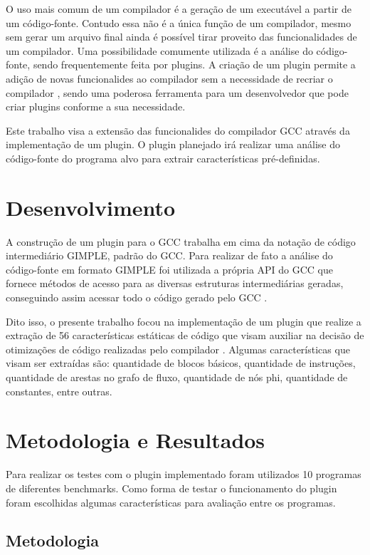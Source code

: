 \documentclass[journal]{IEEEtran}
\begin{document}
O uso mais comum de um compilador é a geração de um executável a partir de um código-fonte. Contudo essa não é a única função de um compilador, mesmo sem gerar um arquivo final ainda é possível tirar proveito das funcionalidades de um compilador. Uma possibilidade comumente utilizada é a análise do código-fonte, sendo frequentemente feita por plugins. A criação de um plugin permite a adição de novas funcionalides ao compilador sem a necessidade de recriar o compilador \cite{GCC-DOCS}, sendo uma poderosa ferramenta para um desenvolvedor que pode criar plugins conforme a sua necessidade.

Este trabalho visa a extensão das funcionalides do compilador GCC \cite{GCC} através da implementação de um plugin. O plugin planejado irá realizar uma análise do código-fonte do programa alvo para extrair características pré-definidas.

\section{Desenvolvimento}

A construção de um plugin para o GCC trabalha em cima da notação de código intermediário GIMPLE, padrão do GCC. Para realizar de fato a análise do código-fonte em formato GIMPLE foi utilizada a própria API do GCC que fornece métodos de acesso para as diversas estruturas intermediárias geradas, conseguindo assim acessar todo o código gerado pelo GCC \cite{gcc2}.

Dito isso, o presente trabalho focou na implementação de um plugin que realize a extração de 56 características estáticas de código que visam auxiliar na decisão de otimizações de código realizadas pelo compilador \cite{features}. Algumas características que visam ser extraídas são: quantidade de blocos básicos, quantidade de instruções, quantidade de arestas no grafo de fluxo, quantidade de nós phi, quantidade de constantes, entre outras.


\section{Metodologia e Resultados}

Para realizar os testes com o plugin implementado foram utilizados 10 programas de diferentes benchmarks. Como forma de testar o funcionamento do plugin foram escolhidas algumas características para avaliação entre os programas.

\subsection{Metodologia}
\end{document}
